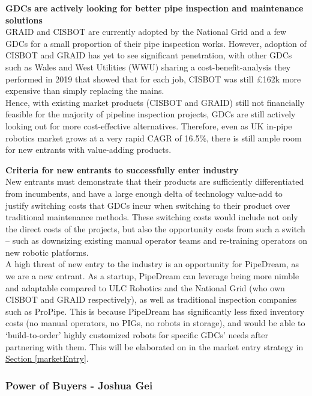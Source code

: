\documentclass[11pt]{article}		%
\newcommand{\sectref}[1]{\hyperref[#1]{Section \ref*{#1}}}     %
\begin{document}
            \textbf{GDCs are actively looking for better pipe inspection and maintenance solutions}
            \\GRAID and CISBOT are currently adopted by the National Grid and a few GDCs for a small proportion of their pipe inspection works. However, adoption of CISBOT and GRAID has yet to see significant penetration, with other GDCs such as Wales and West Utilities (WWU) sharing a cost-benefit-analysis they performed in 2019 that showed that for each job, CISBOT was still £162k more expensive than simply replacing the mains.
             \\\hspace*{3ex}Hence, with existing market products (CISBOT and GRAID) still not financially feasible for the majority of pipeline inspection projects, GDCs are still actively looking out for more cost-effective alternatives. Therefore, even as UK in-pipe robotics market grows at a very rapid CAGR of 16.5\%, there is still ample room for new entrants with value-adding products. 
            
            \textbf{Criteria for new entrants to successfully enter industry}
            \\New entrants must demonstrate that their products are sufficiently differentiated from incumbents, and have a large enough delta of technology value-add to justify switching costs that GDCs incur when switching to their product over traditional maintenance methods. These switching costs would include not only the direct costs of the projects, but also the opportunity costs from such a switch – such as downsizing existing manual operator teams and re-training operators on new robotic platforms. 
            \\\hspace*{3ex}A high threat of new entry to the industry is an opportunity for PipeDream, as we are a new entrant. As a startup, PipeDream can leverage being more nimble and adaptable compared to ULC Robotics and the National Grid (who own CISBOT and GRAID respectively), as well as traditional inspection companies such as ProPipe. This is because PipeDream has significantly less fixed inventory costs (no manual operators, no PIGs, no robots in storage), and would be able to ‘build-to-order’ highly customized robots for specific GDCs’ needs after partnering with them. This will be elaborated on in the market entry strategy in \sectref{marketEntry}. 

			\subsubsection{Power of Buyers - Joshua Gei}
			
\end{document}
